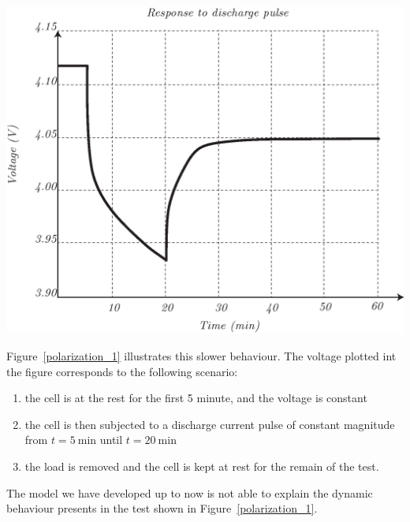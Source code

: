 \documentclass[11pt,a4paper]{article}
\numberwithin{equation}{section}
\theoremstyle{it}
\theoremstyle{definition}
\begin{document}
\begin{minipage}{0.4\textwidth}%
	\includegraphics[width=\linewidth]{figures/lithium_ion_battery/cell_response_1.eps}
	\label{polarization_1}
\end{minipage}%
\hfill%
\begin{minipage}{0.55\textwidth}
	Figure~\ref{polarization_1} illustrates this slower behaviour. The voltage plotted int the figure corresponds to the following scenario: \begin{enumerate}
		\item the cell is at the rest for the first 5 minute, and the voltage is constant
		\item the cell is then subjected to a discharge current pulse of constant magnitude from $t=\SI{5}{\minute}$ until $t=\SI{20}{\minute}$
		\item the load is removed and the cell is kept at rest for the remain of the test. 
	\end{enumerate}
The model we have developed up to now is not able to explain the dynamic behaviour presents in the test shown in Figure~\ref{polarization_1}.
\end{minipage}
\end{document}
